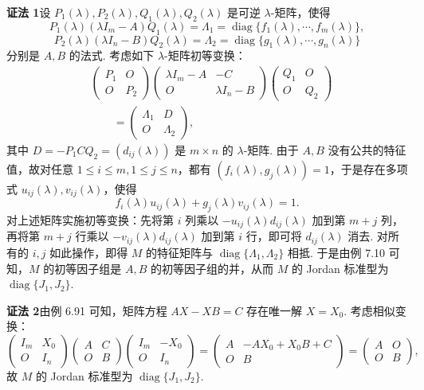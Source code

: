 \documentclass[UTF8, 12pt, fontset=fandol, oneside]{ctexart}
\begin{document}
\noindent\textbf{证法 1}\quad 设 $P_1(\lambda),P_2(\lambda),Q_1(\lambda),Q_2(\lambda)$ 是可逆 $\lambda$-矩阵，使得
\[
P_1(\lambda)(\lambda I_m-A)Q_1(\lambda)=\Lambda_1=\operatorname{diag}\{f_1(\lambda),\cdots,f_m(\lambda)\},
\]
\[
P_2(\lambda)(\lambda I_n-B)Q_2(\lambda)=\Lambda_2=\operatorname{diag}\{g_1(\lambda),\cdots,g_n(\lambda)\}
\]
分别是 $A,B$ 的法式. 考虑如下 $\lambda$-矩阵初等变换：
\[
\begin{aligned}
&\left(\begin{array}{cc}P_1&O\\O&P_2\end{array}\right)
\left(\begin{array}{cc}\lambda I_m-A&-C\\O&\lambda I_n-B\end{array}\right)
\left(\begin{array}{cc}Q_1&O\\O&Q_2\end{array}\right)\\
&\qquad =
\left(\begin{array}{cc}\Lambda_1&D\\O&\Lambda_2\end{array}\right),
\end{aligned}
\]
其中 $D=-P_1CQ_2=(d_{ij}(\lambda))$ 是 $m\times n$ 的 $\lambda$-矩阵. 由于 $A,B$ 没有公共的特征值，故对任意 $1\le i\le m,1\le j\le n$，都有 $(f_i(\lambda),g_j(\lambda))=1$，于是存在多项式 $u_{ij}(\lambda),v_{ij}(\lambda)$，使得
\[
f_i(\lambda)u_{ij}(\lambda)+g_j(\lambda)v_{ij}(\lambda)=1.
\]
对上述矩阵实施初等变换：先将第 $i$ 列乘以 $-u_{ij}(\lambda)d_{ij}(\lambda)$ 加到第 $m+j$ 列，再将第 $m+j$ 行乘以 $-v_{ij}(\lambda)d_{ij}(\lambda)$ 加到第 $i$ 行，即可将 $d_{ij}(\lambda)$ 消去. 对所有的 $i,j$ 如此操作，即得 $M$ 的特征矩阵与 $\operatorname{diag}\{\Lambda_1,\Lambda_2\}$ 相抵. 于是由例 7.10 可知，$M$ 的初等因子组是 $A,B$ 的初等因子组的并，从而 $M$ 的 Jordan 标准型为 $\operatorname{diag}\{J_1,J_2\}$.

\noindent\textbf{证法 2}\quad 由例 6.91 可知，矩阵方程 $AX-XB=C$ 存在唯一解 $X=X_0$. 考虑相似变换：
\[
\left(\begin{array}{cc}I_m&X_0\\O&I_n\end{array}\right)
\left(\begin{array}{cc}A&C\\O&B\end{array}\right)
\left(\begin{array}{cc}I_m&-X_0\\O&I_n\end{array}\right)
=\left(\begin{array}{cc}A&-AX_0+X_0B+C\\O&B\end{array}\right)
=\left(\begin{array}{cc}A&O\\O&B\end{array}\right),
\]
故 $M$ 的 Jordan 标准型为 $\operatorname{diag}\{J_1,J_2\}$.
\end{document}

